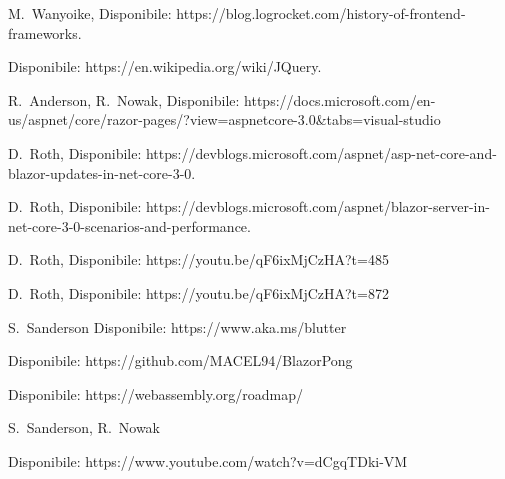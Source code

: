 \begin{thebibliography}{999}

M.~Wanyoike,
Disponibile: https://blog.logrocket.com/history-of-frontend-frameworks.

Disponibile: https://en.wikipedia.org/wiki/JQuery.

R.~Anderson,
R.~Nowak,
Disponibile: https://docs.microsoft.com/en-us/aspnet/core/razor-pages/?view=aspnetcore-3.0\&tabs=visual-studio

D.~Roth,
Disponibile: https://devblogs.microsoft.com/aspnet/asp-net-core-and-blazor-updates-in-net-core-3-0.

D.~Roth,
Disponibile: https://devblogs.microsoft.com/aspnet/blazor-server-in-net-core-3-0-scenarios-and-performance.

D.~Roth,
Disponibile:
https://youtu.be/qF6ixMjCzHA?t=485

D.~Roth,
Disponibile: https://youtu.be/qF6ixMjCzHA?t=872

S.~Sanderson
Disponibile: https://www.aka.ms/blutter

Disponibile: https://github.com/MACEL94/BlazorPong

Disponibile: https://webassembly.org/roadmap/

S.~Sanderson, R.~Nowak

Disponibile: https://www.youtube.com/watch?v=dCgqTDki-VM

%
%
%
%
%
%
%


\end{thebibliography}
